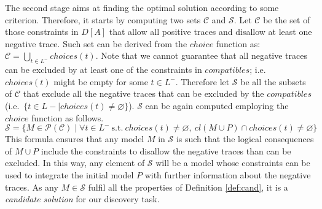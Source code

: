 
The second stage aims at finding the optimal solution according to some criterion. Therefore, it starts by computing two sets $\mathcal{C}$ and $\mathcal{S}$. 
%
Let $\mathcal{C}$ be the set of those constraints in $D[A]$ that allow all positive traces and disallow at least one negative trace. Such set can be derived from the $choice$ function as: $\mathcal{C} = \bigcup_{t\in L^-} choices(t)$.
%
Note that we cannot guarantee that all negative traces can be excluded by at least one of the constraints in ${compatibles}$; i.e.\ ${choices}(t)$ might be empty for some $t\in L^-$. Therefore let $\mathcal{S}$ be all the subsets of $\mathcal{C}$ that exclude all the negative traces that can be excluded by the ${compatibles}$ (i.e.\ $\{t\in L-\mid {choices}(t)\neq \varnothing\}$). $\mathcal{S}$ can be again computed employing the $choice$ function as follows. 
\begin{equation}
\mathcal{S}=\{M\in\mathcal{P}(\mathcal{C})\mid \forall t\in L^-~\text{s.t.}~{choices}(t)\neq \varnothing,~ cl(M\cup P)\cap {choices}(t)\neq \varnothing\} \label{eq:mathcalS}
\end{equation}
This formula ensures that any model $M$ in $\mathcal{S}$ is such that the logical consequences of $M \cup P$ include the constraints to disallow the negative traces than can be excluded. In this way, any element of $\mathcal{S}$ will be a model whose constraints can be used to integrate the initial model $P$ with further information about the negative traces. As any $M \in \mathcal{S}$ fulfil all the properties of Definition \ref{def:cand}, it is a \emph{candidate solution} for our discovery task.

